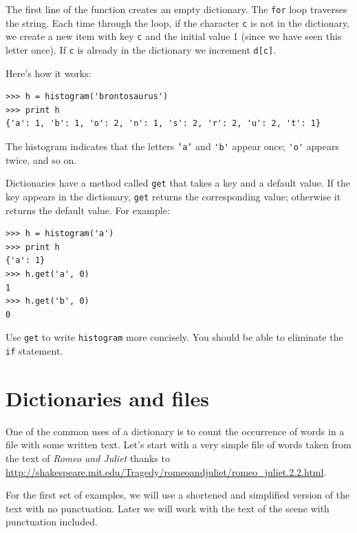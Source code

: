 \documentclass[10pt]{book}
\begin{document}

The first line of the
function creates an empty dictionary.  The {\tt for} loop traverses
the string.  Each time through the loop, if the character {\tt c} is
not in the dictionary, we create a new item with key {\tt c} and the
initial value 1 (since we have seen this letter once).  If {\tt c} is
already in the dictionary we increment {\tt d[c]}.


Here's how it works:

\beforeverb
\begin{verbatim}
>>> h = histogram('brontosaurus')
>>> print h
{'a': 1, 'b': 1, 'o': 2, 'n': 1, 's': 2, 'r': 2, 'u': 2, 't': 1}
\end{verbatim}
\afterverb
%
The histogram indicates that the letters {\tt 'a'} and \verb"'b'"
appear once; \verb"'o'" appears twice, and so on.

\begin{ex}


Dictionaries have a method called {\tt get} that takes a key
and a default value.  If the key appears in the dictionary,
{\tt get} returns the corresponding value; otherwise it returns
the default value.  For example:

\beforeverb
\begin{verbatim}
>>> h = histogram('a')
>>> print h
{'a': 1}
>>> h.get('a', 0)
1
>>> h.get('b', 0)
0
\end{verbatim}
\afterverb
%
Use {\tt get} to write {\tt histogram} more concisely.  You
should be able to eliminate the {\tt if} statement.
\end{ex}

\section{Dictionaries and files}

One of the common uses of a dictionary is to count the occurrence
of words in a file with some written text.  
Let's start with a very simple file of
words taken from the text of \emph{Romeo and Juliet}
thanks to 
\url{http://shakespeare.mit.edu/Tragedy/romeoandjuliet/romeo_juliet.2.2.html}.

For the first set of examples, we will use a shortened and simplified version
of the text with no punctuation.  Later we will work with the text of the 
scene with punctuation included.
\end{document}
